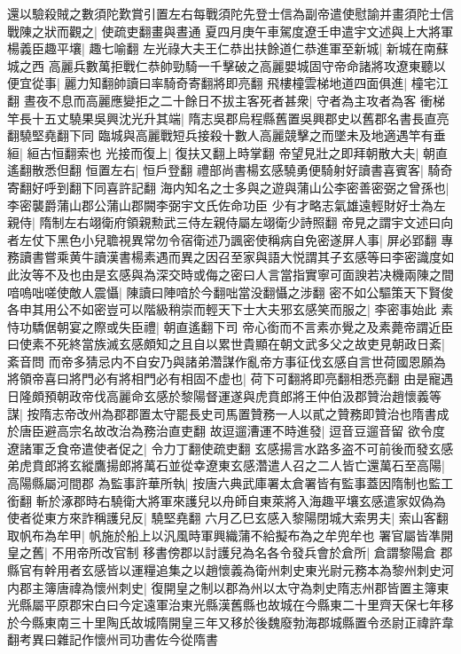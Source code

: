 還以驗殺賊之數須陀歎賞引置左右每戰須陀先登士信為副帝遣使慰諭并畫須陀士信戰陳之狀而觀之|{
	使疏吏翻畫與晝通}
夏四月庚午車駕度遼壬申遣宇文述與上大將軍楊義臣趣平壤|{
	趣七喻翻}
左光祿大夫王仁恭出扶餘道仁恭進軍至新城|{
	新城在南蘇城之西}
高麗兵數萬拒戰仁恭帥勁騎一千擊破之高麗嬰城固守帝命諸將攻遼東聽以便宜從事|{
	麗力知翻帥讀曰率騎奇寄翻將即亮翻}
飛樓橦雲梯地道四面俱進|{
	橦宅江翻}
晝夜不息而高麗應變拒之二十餘日不拔主客死者甚衆|{
	守者為主攻者為客}
衝梯竿長十五丈驍果吳興沈光升其端|{
	隋志吳郡烏程縣舊置吳興郡史以舊郡名書長直亮翻驍堅堯翻下同}
臨城與高麗戰短兵接殺十數人高麗競擊之而墜未及地適遇竿有垂絙|{
	絙古恒翻索也}
光接而復上|{
	復扶又翻上時掌翻}
帝望見壯之即拜朝散大夫|{
	朝直遙翻散悉但翻}
恒置左右|{
	恒戶登翻}
禮部尚書楊玄感驍勇便騎射好讀書喜賓客|{
	騎奇寄翻好呼到翻下同喜許記翻}
海内知名之士多與之遊與蒲山公李密善密弼之曾孫也|{
	李密襲爵蒲山郡公蒲山郡闕李弼宇文氏佐命功臣}
少有才略志氣雄遠輕財好士為左親侍|{
	隋制左右翊衛府領親勲武三侍左親侍屬左翊衛少詩照翻}
帝見之謂宇文述曰向者左仗下黑色小兒聸視異常勿令宿衛述乃諷密使稱病自免密遂屏人事|{
	屏必郢翻}
專務讀書嘗乘黄牛讀漢書楊素遇而異之因召至家與語大悦謂其子玄感等曰李密識度如此汝等不及也由是玄感與為深交時或侮之密曰人言當指實寧可面諛若决機兩陳之間喑嗚咄嗟使敵人震懾|{
	陳讀曰陣喑於今翻咄當没翻懾之涉翻}
密不如公驅策天下賢俊各申其用公不如密豈可以階級稍崇而輕天下士大夫邪玄感笑而服之|{
	李密事始此}
素恃功驕倨朝宴之際或失臣禮|{
	朝直遙翻下司}
帝心銜而不言素亦覺之及素薨帝謂近臣曰使素不死終當族滅玄感頗知之且自以累世貴顯在朝文武多父之故吏見朝政日紊|{
	紊音問}
而帝多猜忌内不自安乃與諸弟濳謀作亂帝方事征伐玄感自言世荷國恩願為將領帝喜曰將門必有將相門必有相固不虚也|{
	荷下可翻將即亮翻相悉亮翻}
由是寵遇日隆頗預朝政帝伐高麗命玄感於黎陽督運遂與虎賁郎將王仲伯汲郡贊治趙懷義等謀|{
	按隋志帝改州為郡郡置太守罷長史司馬置贊務一人以貳之贊務即贊治也隋書成於唐臣避高宗名故改治為務治直吏翻}
故逗遛漕運不時進發|{
	逗音豆遛音留}
欲令度遼諸軍乏食帝遣使者促之|{
	令力丁翻使疏吏翻}
玄感揚言水路多盗不可前後而發玄感弟虎賁郎將玄縱鷹揚郎將萬石並從幸遼東玄感濳遣人召之二人皆亡還萬石至高陽|{
	高陽縣屬河間郡}
為監事許華所執|{
	按唐六典武庫署太倉署皆有監事蓋因隋制也監工銜翻}
斬於涿郡時右驍衛大將軍來護兒以舟師自東萊將入海趣平壤玄感遣家奴偽為使者從東方來詐稱護兒反|{
	驍堅堯翻}
六月乙巳玄感入黎陽閉城大索男夫|{
	索山客翻}
取帆布為牟甲|{
	帆施於船上以汎風時軍興織蒲不給擬布為之牟兜牟也}
署官屬皆凖開皇之舊|{
	不用帝所改官制}
移書傍郡以討護兒為名各令發兵會於倉所|{
	倉謂黎陽倉}
郡縣官有幹用者玄感皆以運糧追集之以趙懷義為衛州刺史東光尉元務本為黎州刺史河内郡主簿唐禕為懷州刺史|{
	復開皇之制以郡為州以太守為刺史隋志州郡皆置主簿東光縣屬平原郡宋白曰今定遠軍治東光縣漢舊縣也故城在今縣東二十里齊天保七年移於今縣東南三十里陶氏故城隋開皇三年又移於後魏廢勃海郡城縣置令丞尉正禕許韋翻考異曰雜記作懷州司功書佐今從隋書}
